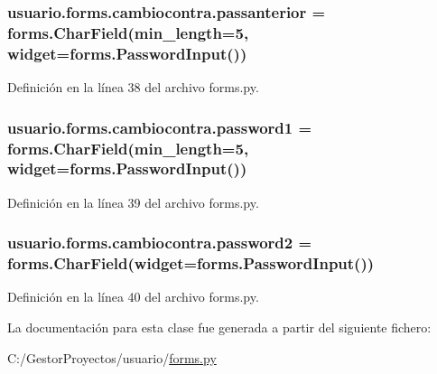 \subsubsection[{\texorpdfstring{passanterior}{passanterior}}]{\setlength{\rightskip}{0pt plus 5cm}usuario.\+forms.\+cambiocontra.\+passanterior = forms.\+Char\+Field(min\+\_\+length=5, widget=forms.\+Password\+Input())\hspace{0.3cm}{\ttfamily [static]}}\hypertarget{classusuario_1_1forms_1_1cambiocontra_ad87c4cc32bc763f4fc67f6d583aacb10}{}\label{classusuario_1_1forms_1_1cambiocontra_ad87c4cc32bc763f4fc67f6d583aacb10}


Definición en la línea 38 del archivo forms.\+py.

\subsubsection[{\texorpdfstring{password1}{password1}}]{\setlength{\rightskip}{0pt plus 5cm}usuario.\+forms.\+cambiocontra.\+password1 = forms.\+Char\+Field(min\+\_\+length=5, widget=forms.\+Password\+Input())\hspace{0.3cm}{\ttfamily [static]}}\hypertarget{classusuario_1_1forms_1_1cambiocontra_a94c9c70a31c69534c05b871a0b92d574}{}\label{classusuario_1_1forms_1_1cambiocontra_a94c9c70a31c69534c05b871a0b92d574}


Definición en la línea 39 del archivo forms.\+py.

\subsubsection[{\texorpdfstring{password2}{password2}}]{\setlength{\rightskip}{0pt plus 5cm}usuario.\+forms.\+cambiocontra.\+password2 = forms.\+Char\+Field(widget=forms.\+Password\+Input())\hspace{0.3cm}{\ttfamily [static]}}\hypertarget{classusuario_1_1forms_1_1cambiocontra_a7bcc3d86de533f3dc7ce291b037aa791}{}\label{classusuario_1_1forms_1_1cambiocontra_a7bcc3d86de533f3dc7ce291b037aa791}


Definición en la línea 40 del archivo forms.\+py.



La documentación para esta clase fue generada a partir del siguiente fichero\+:\begin{DoxyCompactItemize}
\item 
C\+:/\+Gestor\+Proyectos/usuario/\hyperlink{usuario_2forms_8py}{forms.\+py}\end{DoxyCompactItemize}

